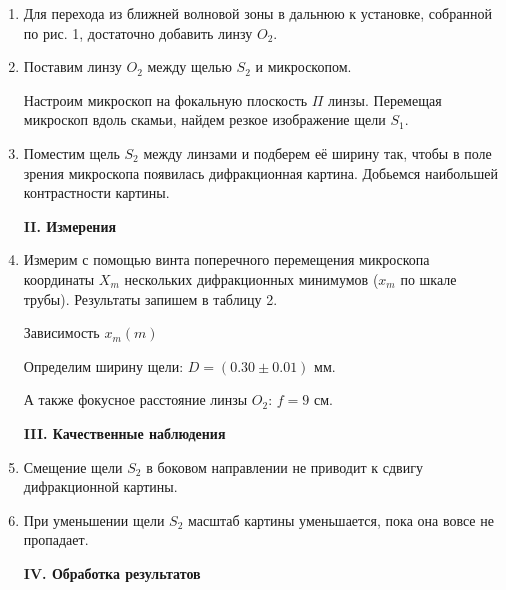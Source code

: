 \documentclass[12pt,a4paper]{article}
\begin{document}
	\begin{enumerate}
		\item Для перехода из ближней волновой зоны в дальнюю к установке, собранной по рис. 1, достаточно добавить линзу $O_2$.
		
		\item Поставим линзу $O_2$ между щелью $S_2$ и микроскопом.
		
		Настроим микроскоп на фокальную плоскость $\Pi$ линзы. Перемещая микроскоп вдоль скамьи, найдем резкое изображение щели $S_1$.
		
		\item Поместим щель $S_2$ между линзами и подберем её ширину так, чтобы в поле зрения микроскопа появилась дифракционная картина. Добьемся наибольшей контрастности картины.
		
		\begin{center}
			\textbf{II. Измерения}
		\end{center}
	
		\item Измерим с помощью винта поперечного перемещения микроскопа координаты $X_m$ нескольких дифракционных минимумов ($x_m$ по шкале трубы). Результаты запишем в таблицу 2.

        \begin{table}[H]
    	   \centering
    	   \footnotesize
    	   
    	   \caption{Зависимость $x_m(m)$}
    	   \label{tab:t2}
        \end{table}
	
		Определим ширину щели: $D = (0.30 \pm 0.01)$ мм.
		
		А также фокусное расстояние линзы $O_2$: $f = 9$ см.
		
		\begin{center}
			\textbf{III. Качественные наблюдения}
		\end{center}
	
		\item Смещение щели $S_2$ в боковом направлении не приводит к сдвигу дифракционной картины.
		
		\item При уменьшении щели $S_2$ масштаб картины уменьшается, пока она вовсе не пропадает.
		
		
		\begin{center}
			\textbf{IV. Обработка результатов}
		\end{center}
		

\end{enumerate}
\end{document}

